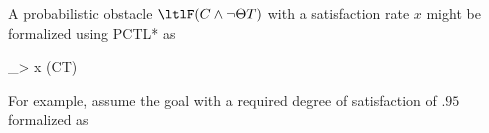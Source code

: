             
            
            
			
            
        
        
        
      
      \stopsubsection
          
      \startsubsection[title={Formal Specification of Probabilistic Obstacles}]
      
    
      A probabilistic obstacle $\ltlF (C \wedge \neg\Theta T)$ with a satisfaction rate $x$
      might be formalized using PCTL* as
        
      \startformula
        
        \ltlF {}_{> x} (C\wedge\neg\Theta T)
        
      \stopformula
        
      For example, assume the goal  
      with a required degree of satisfaction of $.95$
      formalized as
      
